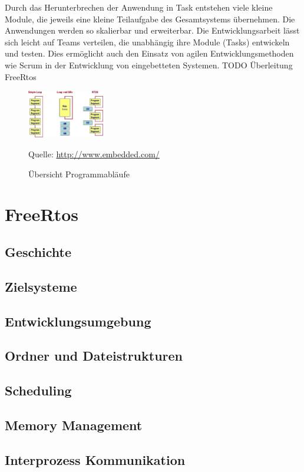 \documentclass[ngerman]{seminarvorlage}
\newcommand*{\quelle}{%
  \footnotesize Quelle: 
}
\begin{document}
Durch das Herunterbrechen der Anwendung in Task entstehen viele kleine Module, die jeweils eine kleine Teilaufgabe des Gesamtsystems übernehmen. Die Anwendungen werden so skalierbar und erweiterbar. Die Entwicklungsarbeit lässt sich leicht auf Teams verteilen, die unabhängig ihre Module (Tasks) entwickeln und testen. Dies ermöglicht auch den Einsatz von agilen Entwicklungsmethoden wie Scrum in der Entwicklung von eingebetteten Systemen. 
\newline
TODO Überleitung FreeRtos
\newline  
\begin{figure}
	\centering
		\includegraphics[width=0.3\textwidth]{Pictures/EmbeddedCom/cwrtos2f5c.jpg}
	\caption{Übersicht Programmabläufe}
	\quelle\url{http://www.embedded.com/}
	\label{fig:Programmablauf}
\end{figure}

\section{FreeRtos} 
\subsection{Geschichte}
\subsection{Zielsysteme}
\subsection{Entwicklungsumgebung}
\subsection{Ordner und Dateistrukturen} 
\subsection{Scheduling}
\subsection{Memory Management}
\subsection{Interprozess Kommunikation}
\end{document}
